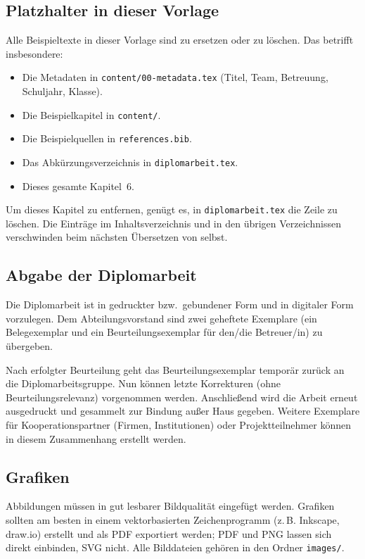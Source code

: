 \subsection{Platzhalter in dieser Vorlage}

Alle Beispieltexte in dieser Vorlage sind zu ersetzen oder zu löschen. Das
betrifft insbesondere:

\begin{itemize}
  \item Die Metadaten in \lstinline|content/00-metadata.tex| (Titel, Team, Betreuung,
        Schuljahr, Klasse).
  \item Die Beispielkapitel in \lstinline|content/|.
  \item Die Beispielquellen in \lstinline|references.bib|.
  \item Das Abkürzungsverzeichnis in \lstinline|diplomarbeit.tex|.
  \item Dieses gesamte Kapitel~6.
\end{itemize}

Um dieses Kapitel zu entfernen, genügt es, in \lstinline|diplomarbeit.tex|
die Zeile \lstinline|| zu löschen. Die Einträge
im Inhaltsverzeichnis und in den übrigen Verzeichnissen verschwinden beim
nächsten Übersetzen von selbst.

\subsection{Abgabe der Diplomarbeit}

Die Diplomarbeit ist in gedruckter bzw.\ gebundener Form und in digitaler
Form vorzulegen. Dem Abteilungsvorstand sind zwei geheftete Exemplare (ein
Belegexemplar und ein Beurteilungsexemplar für den/die Betreuer/in) zu
übergeben.

Nach erfolgter Beurteilung geht das Beurteilungsexemplar temporär zurück an
die Diplomarbeitsgruppe. Nun können letzte Korrekturen (ohne
Beurteilungsrelevanz) vorgenommen werden. Anschließend wird die Arbeit erneut
ausgedruckt und gesammelt zur Bindung außer Haus gegeben. Weitere Exemplare
für Kooperationspartner (Firmen, Institutionen) oder Projektteilnehmer können
in diesem Zusammenhang erstellt werden.

\subsection{Grafiken}

Abbildungen müssen in gut lesbarer Bildqualität eingefügt werden. Grafiken
sollten am besten in einem vektorbasierten Zeichenprogramm (z.\,B. Inkscape,
draw.io) erstellt und als PDF exportiert werden; PDF und PNG lassen sich
direkt einbinden, SVG nicht. Alle Bilddateien gehören in den Ordner
\lstinline|images/|.

